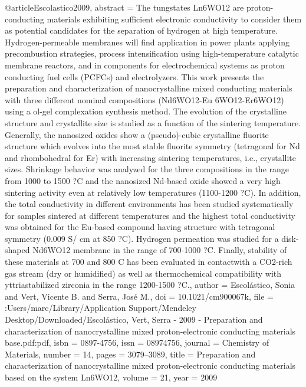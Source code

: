 @article{Escolastico2009,
abstract = {The tungstates Ln6WO12 are proton-conducting materials exhibiting sufficient electronic conductivity to consider them as potential candidates for the separation of hydrogen at high temperature. Hydrogen-permeable membranes will find application in power plants applying precombustion strategies, process intensification using high-temperature catalytic membrane reactors, and in components for electrochemical systems as proton conducting fuel cells (PCFCs) and electrolyzers. This work presents the preparation and characterization of nanocrystalline mixed conducting materials with three different nominal compositions (Nd6WO12-Eu 6WO12-Er6WO12) using a ol-gel complexation synthesis method. The evolution of the crystalline structure and crystallite size is studied as a function of the sintering temperature. Generally, the nanosized oxides show a (pseudo)-cubic crystalline fluorite structure which evolves into the most stable fluorite symmetry (tetragonal for Nd and rhombohedral for Er) with increasing sintering temperatures, i.e., crystallite sizes. Shrinkage behavior was analyzed for the three compositions in the range from 1000 to 1500 ?C and the nanosized Nd-based oxide showed a very high sintering activity even at relatively low temperatures (1100-1200 ?C). In addition, the total conductivity in different environments has been studied systematically for samples sintered at different temperatures and the highest total conductivity was obtained for the Eu-based compound having structure with tetragonal symmetry (0.009 S/ cm at 850 ?C). Hydrogen permeation was studied for a disk-shaped Nd6WO12 membrane in the range of 700-1000 ?C. Finally, stability of these materials at 700 and 800 C has been evaluated in contactwith a CO2-rich gas stream (dry or humidified) as well as thermochemical compatibility with yttriastabilized zirconia in the range 1200-1500 ?C.},
author = {Escol{\'{a}}stico, Sonia and Vert, Vicente B. and Serra, Jos{\'{e}} M.},
doi = {10.1021/cm900067k},
file = {:Users/marc/Library/Application Support/Mendeley Desktop/Downloaded/Escol{\'{a}}stico, Vert, Serra - 2009 - Preparation and characterization of nanocrystalline mixed proton-electronic conducting materials base.pdf:pdf},
isbn = {0897-4756},
issn = {08974756},
journal = {Chemistry of Materials},
number = {14},
pages = {3079--3089},
title = {{Preparation and characterization of nanocrystalline mixed proton-electronic conducting materials based on the system Ln6WO12}},
volume = {21},
year = {2009}
}
